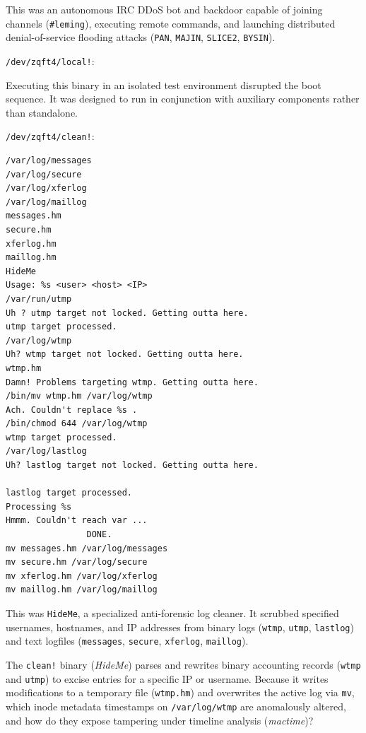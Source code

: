 \vspace{1em}

This was an autonomous IRC DDoS bot and backdoor capable of joining channels (\texttt{\#leming}), executing remote commands, and launching distributed denial-of-service flooding attacks (\texttt{PAN}, \texttt{MAJIN}, \texttt{SLICE2}, \texttt{BYSIN}).

\texttt{/dev/zqft4/local!}:

Executing this binary in an isolated test environment disrupted the boot sequence. It was designed to run in conjunction with auxiliary components rather than standalone.

\texttt{/dev/zqft4/clean!}:

\vspace{1em}

\begin{lstlisting}[style=terminal]
/var/log/messages
/var/log/secure
/var/log/xferlog
/var/log/maillog
messages.hm
secure.hm
xferlog.hm
maillog.hm
HideMe
Usage: %s <user> <host> <IP>
/var/run/utmp
Uh ? utmp target not locked. Getting outta here.
utmp target processed.
/var/log/wtmp
Uh? wtmp target not locked. Getting outta here.
wtmp.hm
Damn! Problems targeting wtmp. Getting outta here.
/bin/mv wtmp.hm /var/log/wtmp
Ach. Couldn't replace %s .
/bin/chmod 644 /var/log/wtmp
wtmp target processed.
/var/log/lastlog
Uh? lastlog target not locked. Getting outta here.

lastlog target processed.
Processing %s
Hmmm. Couldn't reach var ...
                DONE.
mv messages.hm /var/log/messages
mv secure.hm /var/log/secure
mv xferlog.hm /var/log/xferlog
mv maillog.hm /var/log/maillog
\end{lstlisting}

\vspace{1em}

This was \texttt{HideMe}, a specialized anti-forensic log cleaner. It scrubbed specified usernames, hostnames, and IP addresses from binary logs (\texttt{wtmp}, \texttt{utmp}, \texttt{lastlog}) and text logfiles (\texttt{messages}, \texttt{secure}, \texttt{xferlog}, \texttt{maillog}).

\begin{retoforense}
The \texttt{clean!} binary (\textit{HideMe}) parses and rewrites binary accounting records (\texttt{wtmp} and \texttt{utmp}) to excise entries for a specific IP or username. Because it writes modifications to a temporary file (\texttt{wtmp.hm}) and overwrites the active log via \texttt{mv}, which inode metadata timestamps on \texttt{/var/log/wtmp} are anomalously altered, and how do they expose tampering under timeline analysis (\textit{mactime})?
\end{retoforense}


